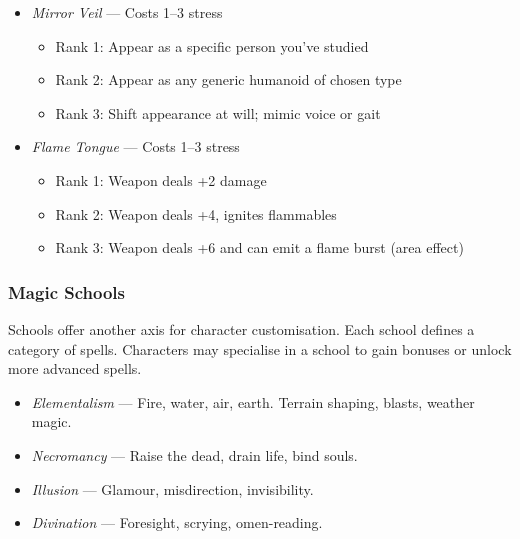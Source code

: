 \begin{Example}
    \begin{itemize}
        \item \textit{Mirror Veil} — Costs 1–3 stress
        \begin{itemize}
            \item Rank 1: Appear as a specific person you've studied
            \item Rank 2: Appear as any generic humanoid of chosen type
            \item Rank 3: Shift appearance at will; mimic voice or gait
        \end{itemize}
        
        \item \textit{Flame Tongue} — Costs 1–3 stress
        \begin{itemize}
            \item Rank 1: Weapon deals +2 damage
            \item Rank 2: Weapon deals +4, ignites flammables
            \item Rank 3: Weapon deals +6 and can emit a flame burst (area effect)
        \end{itemize}
    \end{itemize}
\end{Example}

\subsubsection{Magic Schools}

Schools offer another axis for character customisation. Each school defines a category of spells. Characters may specialise in a school to gain bonuses or unlock more advanced spells.

\begin{Example}
    \begin{itemize}
        \item \textit{Elementalism} — Fire, water, air, earth. Terrain shaping, blasts, weather magic.
        \item \textit{Necromancy} — Raise the dead, drain life, bind souls.
        \item \textit{Illusion} — Glamour, misdirection, invisibility.
        \item \textit{Divination} — Foresight, scrying, omen-reading.
    \end{itemize}
\end{Example}

